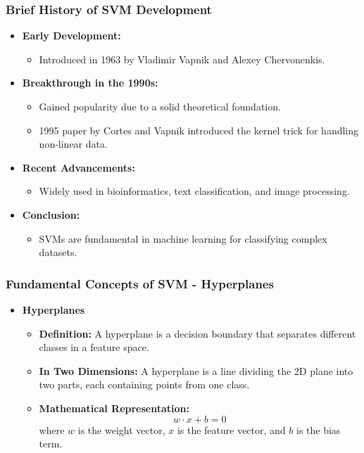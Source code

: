 \documentclass{beamer}
\begin{document}
\begin{frame}[fragile]
    \frametitle{Brief History of SVM Development}
    \begin{itemize}
        \item \textbf{Early Development:}
            \begin{itemize}
                \item Introduced in 1963 by Vladimir Vapnik and Alexey Chervonenkis.
            \end{itemize}
        
        \item \textbf{Breakthrough in the 1990s:}
            \begin{itemize}
                \item Gained popularity due to a solid theoretical foundation.
                \item 1995 paper by Cortes and Vapnik introduced the kernel trick for handling non-linear data.
            \end{itemize}

        \item \textbf{Recent Advancements:}
            \begin{itemize}
                \item Widely used in bioinformatics, text classification, and image processing.
            \end{itemize}
        
        \item \textbf{Conclusion:}
            \begin{itemize}
                \item SVMs are fundamental in machine learning for classifying complex datasets.
            \end{itemize}
    \end{itemize}
\end{frame}

\begin{frame}[fragile]
    \frametitle{Fundamental Concepts of SVM - Hyperplanes}
    \begin{itemize}
        \item \textbf{Hyperplanes}
        \begin{itemize}
            \item \textbf{Definition:} A hyperplane is a decision boundary that separates different classes in a feature space.
            \item \textbf{In Two Dimensions:} A hyperplane is a line dividing the 2D plane into two parts, each containing points from one class.
            \item \textbf{Mathematical Representation:}
            \begin{equation}
                w \cdot x + b = 0
            \end{equation}
            where \( w \) is the weight vector, \( x \) is the feature vector, and \( b \) is the bias term.
        \end{itemize}
    \end{itemize}
\end{frame}
\end{document}
